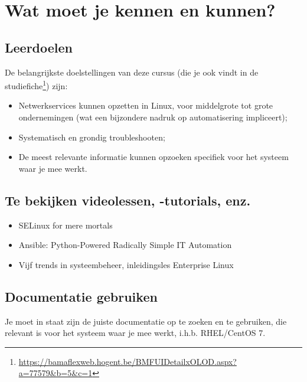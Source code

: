 \section{Wat moet je kennen en kunnen?}
\label{sec:wat-moet-je-kennen-en-kunnen}

\subsection{Leerdoelen}
\label{subs:leerdoelen}

De belangrijkste doelstellingen van deze cursus (die je ook vindt in de studiefiche\footnote{\url{https://bamaflexweb.hogent.be/BMFUIDetailxOLOD.aspx?a=77579&b=5&c=1}}) zijn:

\begin{itemize}
\item Netwerkservices kunnen opzetten in Linux, voor middelgrote tot grote ondernemingen (wat een bijzondere nadruk op automatisering impliceert);
\item Systematisch en grondig troubleshooten;
\item De meest relevante informatie kunnen opzoeken specifiek voor het systeem waar je mee werkt.
\end{itemize}

\subsection{Te bekijken videolessen, -tutorials, enz.}
\label{subs:te-bekijken-videolessen--tutorials-enz.}


\begin{itemize}
  \item SELinux for mere mortals~\autocite{Cameron2012}
  \item Ansible: Python-Powered Radically Simple IT Automation~\autocite{DeHaan2014}
  \item Vijf trends in systeembeheer, inleidingsles Enterprise Linux~\autocite{VanVreckem2013}
\end{itemize}

\subsection{Documentatie gebruiken}
\label{subs:documentatie-gebruiken}

Je moet in staat zijn de juiste documentatie op te zoeken en te gebruiken, die relevant is voor het systeem waar je mee werkt, i.h.b. RHEL/CentOS 7.

